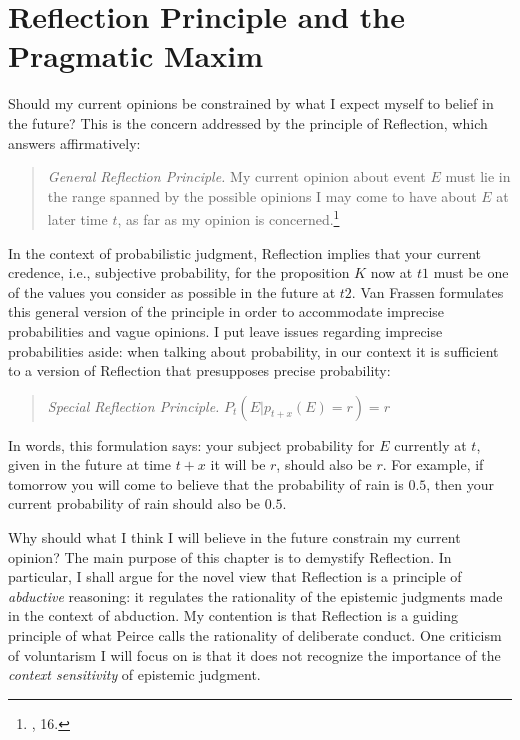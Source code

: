 
\hypertarget{reflection-principle-and-the-pragmatic-maxim}{%
\chapter{Reflection Principle and the Pragmatic
Maxim}\label{ch:reflectionmaxim}}

Should my current opinions be constrained by what I expect myself to
belief in the future? This is the concern addressed by the principle of
Reflection, which answers affirmatively:

\begin{quote}
\emph{General Reflection Principle.} My current opinion about event
\(E\) must lie in the range spanned by the possible opinions I may come
to have about \(E\) at later time \(t\), as far as my opinion is
concerned.\footnote{\cite{beliefuly}, 16.}
\end{quote}

In the context of probabilistic judgment, Reflection implies that your
current credence, i.e., subjective probability, for the proposition
\(K\) now at \(t1\) must be one of the values you consider as possible
in the future at \(t2\). Van Frassen formulates this general version of
the principle in order to accommodate imprecise probabilities and vague
opinions. I put leave issues regarding imprecise probabilities aside:
when talking about probability, in our context it is sufficient to a
version of Reflection that presupposes precise probability:

\begin{quote}
\emph{Special Reflection Principle.} \(P_t(E|p_{t+x} (E) = r)=r\)
\end{quote}

In words, this formulation says: your subject probability for \(E\)
currently at \(t\), given in the future at time \(t+x\) it will be
\(r\), should also be \(r\). For example, if tomorrow you will come to
believe that the probability of rain is \(0.5\), then your current
probability of rain should also be \(0.5\).

Why should what I think I will believe in the future constrain my
current opinion? The main purpose of this chapter is to demystify
Reflection. In particular, I shall argue for the novel view that
Reflection is a principle of \emph{abductive} reasoning: it regulates
the rationality of the epistemic judgments made in the context of
abduction. My contention is that Reflection is a guiding principle of
what Peirce calls the rationality of deliberate conduct. One criticism
of voluntarism I will focus on is that it does not recognize the
importance of the \emph{context sensitivity} of epistemic judgment.


